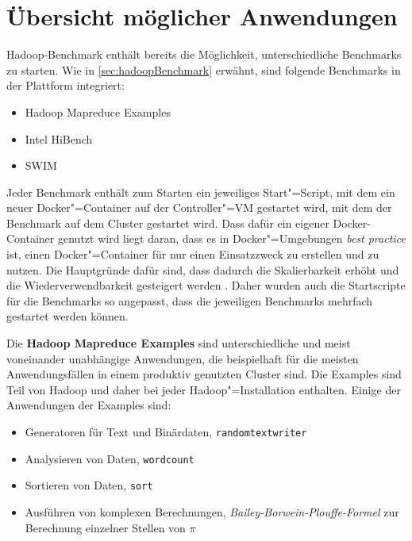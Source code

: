\section{Übersicht möglicher Anwendungen}\label{sec:appOverview}

Hadoop-Benchmark enthält bereits die Möglichkeit, unterschiedliche Benchmarks zu starten. Wie in \autoref{sec:hadoopBenchmark} erwähnt, sind folgende Benchmarks in der Plattform integriert:

\begin{itemize}
    \item Hadoop Mapreduce Examples
    \item Intel HiBench
    \item \ac{SWIM}
\end{itemize}

Jeder Benchmark enthält zum Starten ein jeweiliges Start"=Script, mit dem ein neuer Docker"=Container auf der Controller"=VM gestartet wird, mit dem der Benchmark auf dem Cluster gestartet wird. Dass dafür ein eigener Docker-Container genutzt wird liegt daran, dass es in Docker"=Umgebungen \emph{best practice} ist, einen Docker"=Container für nur einen Einsatzzweck zu erstellen und zu nutzen. Die Hauptgründe dafür sind, dass dadurch die Skalierbarkeit erhöht und die Wiederverwendbarkeit gesteigert werden \cite{DockerBestPractice}. Daher wurden auch die Startscripte für die Benchmarks so angepasst, dass die jeweiligen Benchmarks mehrfach gestartet werden können.

Die \textbf{Hadoop Mapreduce Examples} sind unterschiedliche und meist voneinander unabhängige Anwendungen, die beispielhaft für die meisten Anwendungsfällen in einem produktiv genutzten Cluster sind. Die Examples sind Teil von Hadoop und daher bei jeder Hadoop"=Installation enthalten. Einige der Anwendungen der Examples sind:

\begin{itemize}
    \item Generatoren für Text und Binärdaten, \zB \texttt{randomtextwriter}
    \item Analysieren von Daten, \zB \texttt{wordcount}
    \item Sortieren von Daten, \zB \texttt{sort}
    \item Ausführen von komplexen Berechnungen, \zB \emph{Bailey-Borwein-Plouffe-Formel} zur Berechnung einzelner Stellen von $\pi$
\end{itemize}

